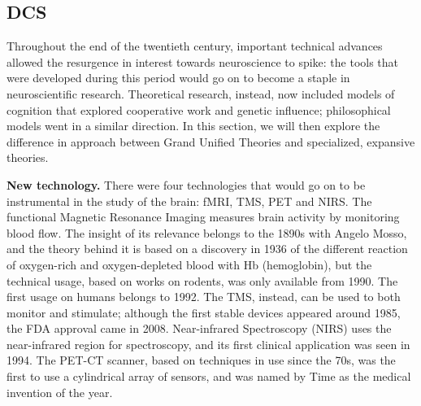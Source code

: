 \documentclass[../main.tex]{subfiles}
\begin{document}
\subsection{DCS}
Throughout the end of the twentieth century, important technical advances allowed the resurgence in interest towards neuroscience to spike: the tools that were developed during this period would go on to become a staple in neuroscientific research. Theoretical research, instead, now included models of cognition that explored cooperative work and genetic influence; philosophical models went in a similar direction. In this section, we will then explore the difference in approach between Grand Unified Theories and specialized, expansive theories.

\vspace{4pt}
\textbf{New technology.} There were four technologies that would go on to be instrumental in the study of the brain: fMRI, TMS, PET and NIRS. The functional Magnetic Resonance Imaging measures brain activity by monitoring blood flow. The insight of its relevance belongs to the 1890s with Angelo Mosso, and the theory behind it is based on a discovery in 1936 of the different reaction of oxygen-rich and oxygen-depleted blood with Hb (hemoglobin), but the technical usage, based on works on rodents\cite{thulbornRoleFerritinHemosiderin1990}\cite{ogawaBrainMagneticResonance1990}, was only available from 1990. The first usage on humans belongs to 1992\cite{kwongDynamicMagneticResonance1992}. The TMS, instead, can be used to both monitor and stimulate; although the first stable devices appeared around 1985, the FDA approval came in 2008\cite{horvathTranscranialMagneticStimulation2011}. Near-infrared Spectroscopy (NIRS) uses the near-infrared region for spectroscopy, and its first clinical application was seen in 1994\cite{ferrariBriefReviewHistory2012}. The PET-CT scanner, based on techniques in use since the 70s, was the first to use a cylindrical array of sensors, and was named by Time as the medical invention of the year.
\end{document}
